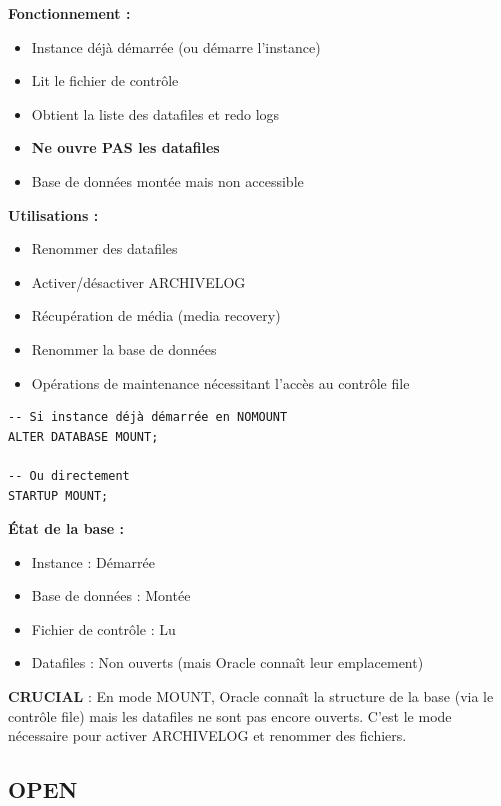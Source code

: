 \documentclass[11pt,a4paper]{article}
\begin{document}
\textbf{Fonctionnement :}
\begin{itemize}
    \item Instance déjà démarrée (ou démarre l'instance)
    \item Lit le fichier de contrôle
    \item Obtient la liste des datafiles et redo logs
    \item \textbf{Ne ouvre PAS les datafiles}
    \item Base de données montée mais non accessible
\end{itemize}

\textbf{Utilisations :}
\begin{itemize}
    \item Renommer des datafiles
    \item Activer/désactiver ARCHIVELOG
    \item Récupération de média (media recovery)
    \item Renommer la base de données
    \item Opérations de maintenance nécessitant l'accès au contrôle file
\end{itemize}

\begin{commandebox}
\begin{lstlisting}
-- Si instance déjà démarrée en NOMOUNT
ALTER DATABASE MOUNT;

-- Ou directement
STARTUP MOUNT;
\end{lstlisting}
\end{commandebox}

\textbf{État de la base :}
\begin{itemize}
    \item Instance : Démarrée
    \item Base de données : Montée
    \item Fichier de contrôle : Lu
    \item Datafiles : Non ouverts (mais Oracle connaît leur emplacement)
\end{itemize}

\begin{importantbox}
\textbf{CRUCIAL} : En mode MOUNT, Oracle connaît la structure de la base (via le contrôle file) mais les datafiles ne sont pas encore ouverts. C'est le mode nécessaire pour activer ARCHIVELOG et renommer des fichiers.
\end{importantbox}

\subsection{OPEN}
\end{document}
